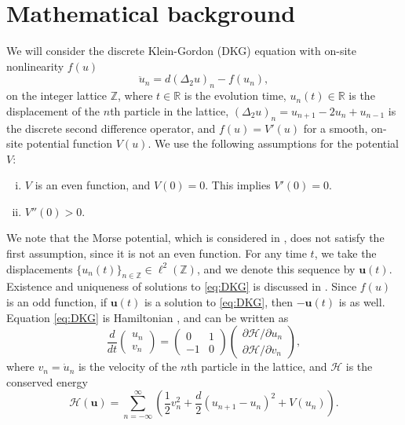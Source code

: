 \documentclass[12pt,reqno]{amsart}
\def\R{{\mathbb R}}
\def\Z{{\mathbb Z}}
\def\calH{\mathcal{H}}
\newcommand{\uvec}{\mathbf{u}}
\theoremstyle{definition}
\begin{document}
\section{Mathematical background}\label{sec:bg}

We will consider the discrete Klein-Gordon (DKG) equation with on-site nonlinearity $f(u)$
\begin{equation}\label{eq:DKG}
\ddot{u}_n = d (\Delta_2 u)_n - f(u_n),
\end{equation}
on the integer lattice $\Z$, where $t \in \R$ is the evolution time, $u_n(t) \in \R$ is the displacement of the $n$th particle in the lattice, $(\Delta_2 u)_n = u_{n+1} - 2 u_n + u_{n-1}$ is the discrete second difference operator, and $f(u) = V'(u)$ for a smooth, on-site potential function $V(u)$. We use the following assumptions for the potential $V$:
\begin{enumerate}[(i)\leftmargin=\parindent]
\item $V$ is an even function, and $V(0) = 0$. This implies $V'(0) = 0$.
\item $V''(0)>0$.
\end{enumerate}
We note that the Morse potential, which is considered in \cite{cuevas-maraver2016}, does not satisfy the first assumption, since it is not an even function. For any time $t$, we take the displacements $\{u_n(t)\}_{n \in \Z} \in \ell^2(\Z)$, and we denote this sequence by $\uvec(t)$. Existence and uniqueness of solutions to \cref{eq:DKG} is discussed in \cite{cuevas-maraver2016}. Since $f(u)$ is an odd function, if $\uvec(t)$ is a solution to \cref{eq:DKG}, then $-\uvec(t)$ is as well. Equation \cref{eq:DKG} is Hamiltonian \cites{KevrekidisWeinstein2000,cuevas-maraver2016}, and can be written as
\begin{equation}\label{eq:Hform}
\frac{d}{dt}\begin{pmatrix} u_n \\ v_n \end{pmatrix} = 
\begin{pmatrix} 0 & 1 \\ -1 & 0 \end{pmatrix}\begin{pmatrix} \partial \calH / \partial u_n \\ \partial \calH / \partial v_n \end{pmatrix},
\end{equation}
where $v_n = \dot{u}_n$ is the velocity of the $n$th particle in the lattice, and $\calH$ is the conserved energy
\begin{equation}\label{eq:H}
	\calH(\uvec) = \sum_{n=-\infty}^\infty 
	\left( \frac{1}{2} v_n^2 + \frac{d}{2} (u_{n+1} - u_n)^2 + V(u_n) \right).
\end{equation}
\end{document}
